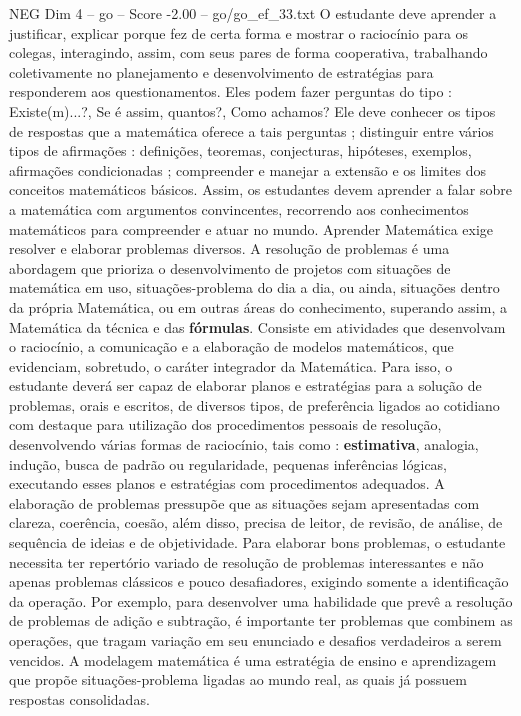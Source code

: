 \begin{textsample}{NEG Dim 4 – go – Score -2.00 – go/go\_ef\_33.txt}
O estudante deve aprender a justificar, explicar porque fez de certa forma e mostrar o raciocínio para os colegas, interagindo, assim, com seus pares de forma cooperativa, trabalhando coletivamente no planejamento e desenvolvimento de estratégias para responderem aos questionamentos.
Eles podem fazer perguntas do tipo : Existe(m)...?, Se é assim, quantos?, Como achamos?
Ele deve conhecer os tipos de respostas que a matemática oferece a tais perguntas ; distinguir entre vários tipos de afirmações : definições, teoremas, conjecturas, hipóteses, exemplos, afirmações condicionadas ; compreender e manejar a extensão e os limites dos conceitos matemáticos básicos.
Assim, os estudantes devem aprender a falar sobre a matemática com argumentos convincentes, recorrendo aos conhecimentos matemáticos para compreender e atuar no mundo.
Aprender Matemática exige resolver e elaborar problemas diversos.
A resolução de problemas é uma abordagem que prioriza o desenvolvimento de projetos com situações de matemática em uso, situações-problema do dia a dia, ou ainda, situações dentro da própria Matemática, ou em outras áreas do conhecimento, superando assim, a Matemática da técnica e das \textbf{fórmulas}.
Consiste em atividades que desenvolvam o raciocínio, a comunicação e a elaboração de modelos matemáticos, que evidenciam, sobretudo, o caráter integrador da Matemática.
Para isso, o estudante deverá ser capaz de elaborar planos e estratégias para a solução de problemas, orais e escritos, de diversos tipos, de preferência ligados ao cotidiano com destaque para utilização dos procedimentos pessoais de resolução, desenvolvendo várias formas de raciocínio, tais como : \textbf{estimativa}, analogia, indução, busca de padrão ou regularidade, pequenas inferências lógicas, executando esses planos e estratégias com procedimentos adequados.
A elaboração de problemas pressupõe que as situações sejam apresentadas com clareza, coerência, coesão, além disso, precisa de leitor, de revisão, de análise, de sequência de ideias e de objetividade.
Para elaborar bons problemas, o estudante necessita ter repertório variado de resolução de problemas interessantes e não apenas problemas clássicos e pouco desafiadores, exigindo somente a identificação da operação.
Por exemplo, para desenvolver uma habilidade que prevê a resolução de problemas de adição e subtração, é importante ter problemas que combinem as operações, que tragam variação em seu enunciado e desafios verdadeiros a serem vencidos.
A modelagem matemática é uma estratégia de ensino e aprendizagem que propõe situações-problema ligadas ao mundo real, as quais já possuem respostas consolidadas.

\end{textsample}
